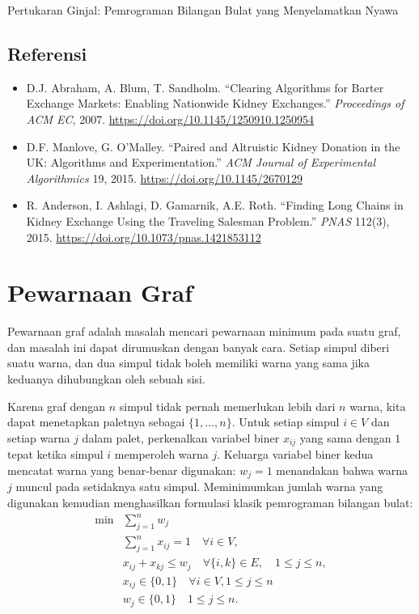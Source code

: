 \begin{casestudybox}{Pertukaran Ginjal: Pemrograman Bilangan Bulat yang Menyelamatkan Nyawa}
\subsection*{Referensi}
\begin{itemize}
\item D.J. Abraham, A. Blum, T. Sandholm. ``Clearing Algorithms for Barter Exchange Markets: Enabling Nationwide Kidney Exchanges.'' \emph{Proceedings of ACM EC}, 2007. \url{https://doi.org/10.1145/1250910.1250954}
\item D.F. Manlove, G. O'Malley. ``Paired and Altruistic Kidney Donation in the UK: Algorithms and Experimentation.'' \emph{ACM Journal of Experimental Algorithmics} 19, 2015. \url{https://doi.org/10.1145/2670129}
\item R. Anderson, I. Ashlagi, D. Gamarnik, A.E. Roth. ``Finding Long Chains in Kidney Exchange Using the Traveling Salesman Problem.'' \emph{PNAS} 112(3), 2015. \url{https://doi.org/10.1073/pnas.1421853112}
\end{itemize}
\end{casestudybox}

\section{Pewarnaan Graf}
\label{sec:graph-coloring}

Pewarnaan graf %
 adalah
masalah mencari pewarnaan minimum pada suatu graf, dan masalah ini dapat dirumuskan dengan banyak cara. Setiap simpul diberi suatu warna, dan dua simpul tidak boleh memiliki warna yang sama jika keduanya dihubungkan oleh sebuah sisi.

Karena graf dengan $n$ simpul tidak pernah memerlukan lebih dari $n$ warna, kita dapat menetapkan paletnya sebagai $\{1, \ldots, n\}$.
Untuk setiap simpul $i \in V$ dan setiap warna $j$ dalam palet, perkenalkan variabel biner $x_{ij}$ yang sama dengan $1$ tepat ketika simpul $i$ memperoleh warna $j$.
Keluarga variabel biner kedua mencatat warna yang benar-benar digunakan: $w_j = 1$ menandakan bahwa warna $j$ muncul pada setidaknya satu simpul.
Meminimumkan jumlah warna yang digunakan kemudian menghasilkan formulasi klasik pemrograman bilangan bulat:
$$
\begin{aligned}
\min & \sum_{j=1}^n w_j \\
& \sum_{j=1}^n x_{i j}=1 \quad \forall i \in V, \\
& x_{i j}+x_{k j} \leq w_j \quad \forall\{i, k\} \in E, \quad 1 \leq j \leq n, \\
& x_{i j} \in\{0,1\} \quad \forall i \in V, 1 \leq j \leq n\\
& w_j \in\{0,1\} \quad 1 \leq j \leq n .
\end{aligned}
$$


